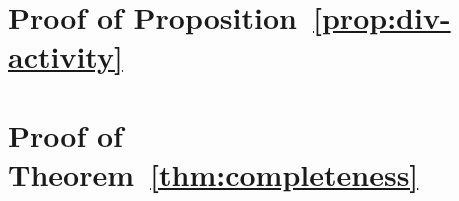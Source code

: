 
\appendix

\section{Proof of Proposition~\ref{prop:div-activity}}\label{ap:div-activity}



\section{Proof of Theorem~\ref{thm:completeness}}\label{ap:completeness}

